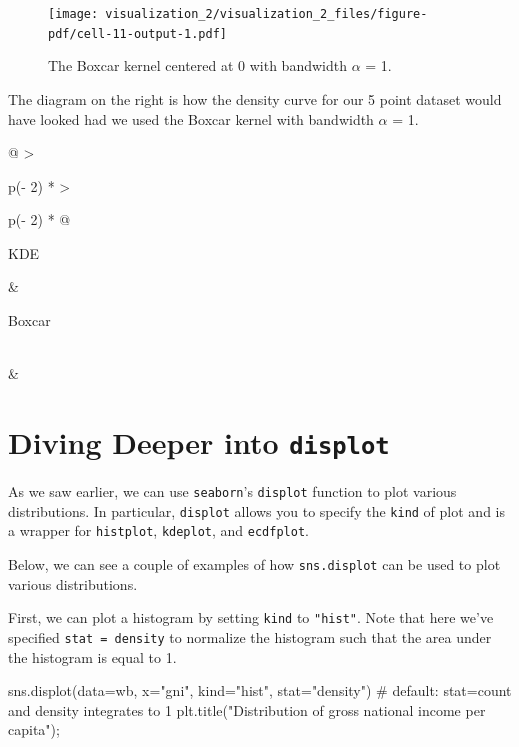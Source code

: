 \documentclass[
  letterpaper,
  DIV=11,
  numbers=noendperiod]{scrreprt}
\newenvironment{Shaded}{\begin{snugshade}}{\end{snugshade}}
\newcommand{\CommentTok}[1]{\textcolor[rgb]{0.37,0.37,0.37}{#1}}
\newcommand{\NormalTok}[1]{\textcolor[rgb]{0.00,0.23,0.31}{#1}}
\newcommand{\OperatorTok}[1]{\textcolor[rgb]{0.37,0.37,0.37}{#1}}
\newcommand{\StringTok}[1]{\textcolor[rgb]{0.13,0.47,0.30}{#1}}
\begin{document}
\begin{figure}[H]

{\centering \texttt{[image: visualization\_2/visualization\_2\_files/figure-pdf/cell-11-output-1.pdf]}

}

\caption{The Boxcar kernel centered at 0 with bandwidth \(\alpha\) = 1.}

\end{figure}%

The diagram on the right is how the density curve for our 5 point
dataset would have looked had we used the Boxcar kernel with bandwidth
\(\alpha\) = 1.

\begin{longtable}[]{@{}
  >{\raggedright\arraybackslash}p{(\columnwidth - 2\tabcolsep) * }
  >{\raggedright\arraybackslash}p{(\columnwidth - 2\tabcolsep) * }@{}}
\toprule\noalign{}
\begin{minipage}[b]{\linewidth}\raggedright
KDE
\end{minipage} & \begin{minipage}[b]{\linewidth}\raggedright
Boxcar
\end{minipage} \\
\midrule\noalign{}
\endhead
\bottomrule\noalign{}
\endlastfoot
& \\
\end{longtable}

\section{\texorpdfstring{Diving Deeper into
\texttt{displot}}{Diving Deeper into displot}}\label{diving-deeper-into-displot}

As we saw earlier, we can use \texttt{seaborn}'s \texttt{displot}
function to plot various distributions. In particular, \texttt{displot}
allows you to specify the \texttt{kind} of plot and is a wrapper for
\texttt{histplot}, \texttt{kdeplot}, and \texttt{ecdfplot}.

Below, we can see a couple of examples of how \texttt{sns.displot} can
be used to plot various distributions.

First, we can plot a histogram by setting \texttt{kind} to
\texttt{"hist"}. Note that here we've specified
\texttt{stat\ =\ density} to normalize the histogram such that the area
under the histogram is equal to 1.

\begin{Shaded}
\begin{Highlighting}[]
\NormalTok{sns.displot(data}\OperatorTok{=}\NormalTok{wb, }
\NormalTok{            x}\OperatorTok{=}\StringTok{"gni"}\NormalTok{, }
\NormalTok{            kind}\OperatorTok{=}\StringTok{"hist"}\NormalTok{, }
\NormalTok{            stat}\OperatorTok{=}\StringTok{"density"}\NormalTok{) }\CommentTok{\# default: stat=count and density integrates to 1}
\NormalTok{plt.title(}\StringTok{"Distribution of gross national income per capita"}\NormalTok{)}\OperatorTok{;}
\end{Highlighting}
\end{Shaded}
\end{document}
